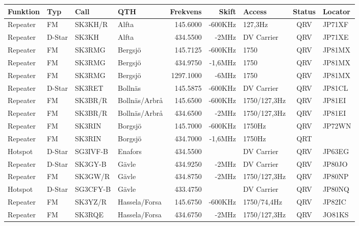 \begin{longtable}{llllrrlcl}

\textbf{Funktion} & \textbf{Typ}    & \textbf{Call}   & \textbf{QTH} & \textbf{Frekvens} & 
\textbf{Skift}    & \textbf{Access} & \textbf{Status} & \textbf{Locator} \\ \hline \endhead

Repeater & FM     & SK3KH/R  & Alfta            & 145.6000  & -600KHz  & 127,3Hz       & QRV & JP71XF \\
Repeater & D-Star & SK3KH    & Alfta            & 434.5500  & -2MHz    & DV Carrier    & QRV & JP71XE \\
Repeater & FM     & SK3RMG   & Bergsjö          & 145.7125  & -600KHz  & 1750          & QRV & JP81MX \\
Repeater & FM     & SK3RMG   & Bergsjö          & 434.9750  & -1,6MHz  & 1750          & QRV & JP81MX \\
Repeater & FM     & SK3RMG   & Bergsjö          & 1297.1000 & -6MHz    & 1750          & QRV & JP81MX \\
Repeater & D-Star & SK3RET   & Bollnäs          & 145.5875  & -600KHz  & DV Carrier    & QRV & JP81CL \\
Repeater & FM     & SK3BR/R  & Bollnäs/Arbrå    & 145.6500  & -600KHz  & 1750/127,3Hz  & QRV & JP81EI \\
Repeater & FM     & SK3BR/R  & Bollnäs/Arbrå    & 434.6500  & -2MHz    & 1750/127,3Hz  & QRV & JP81EI \\
Repeater & FM     & SK3RIN   & Borgsjö          & 145.7000  & -600KHz  & 1750Hz        & QRV & JP72WN \\
Repeater & FM     & SK3RIN   & Borgsjö          & 434.7000  & -1,6MHz  & 1750Hz        & QRT &        \\
Hotspot  & D-Star & SG3IVF-B & Enafors          & 434.5500  &          & DV Carrier    & QRV & JP63EG \\
Repeater & D-Star & SK3GY-B  & Gävle            & 434.9250  & -2MHz    & DV Carrier    & QRV & JP80JO \\
Repeater & FM     & SK3GW/R  & Gävle            & 434.8750  & -2MHz    & 1750/127,3Hz  & QRV & JP80NP \\
Hotspot  & D-Star & SG3CFY-B & Gävle            & 433.4750  &          & DV Carrier    & QRV & JP80NQ \\
Repeater & FM     & SK3YZ/R  & Hassela/Forsa    & 145.6750  & -600KHz  & 1750/74,4Hz   & QRV & JP82IC \\
Repeater & FM     & SK3RQE   & Hassela/Forsa    & 434.6750  & -2MHz    & 1750/127,3Hz  & QRV & JO81KS \\

\end{longtable}
